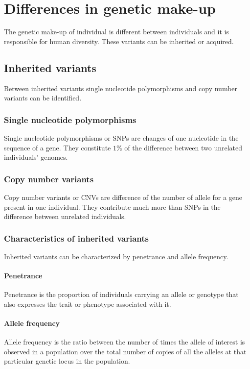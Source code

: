 \section{Differences in genetic make-up}
The genetic make-up of individual is different between individuals and it is responsible for human diversity.
These variants can be inherited or acquired.

	\subsection{Inherited variants}
	Between inherited variants single nucleotide polymorphisms and copy number variants can be identified.

		\subsubsection{Single nucleotide polymorphisms}
		Single nucleotide polymorphisms or SNPs are changes of one nucleotide in the sequence of a gene.
		They constitute $1\%$ of the difference between two unrelated individuals' genomes.

		\subsubsection{Copy number variants}
		Copy number variants or CNVs are difference of the number of allele for a gene present in one individual.
		They contribute much more than SNPs in the difference between unrelated individuals.

		\subsubsection{Characteristics of inherited variants}
		Inherited variants can be characterized by penetrance and allele frequency.

			\paragraph{Penetrance}
			Penetrance is the proportion of individuals carrying an allele or genotype that also expresses the trait or phenotype associated with it.

			\paragraph{Allele frequency}
			Allele frequency is the ratio between the number of times the allele of interest is observed in a population over the total number of copies of all the alleles at that particular genetic locus in the population.

